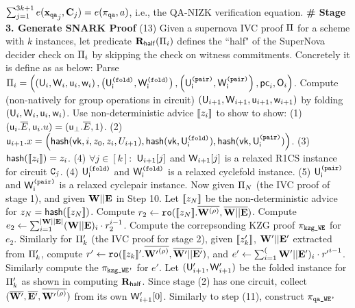 \begin{scriptsize}
\begin{algorithm*}[bt]
	$\sum_{j=1}^{3k+1} e({{{\mathbf {x}}}_{\texttt{qa}}}_j, {{\mathbf {C}}}_j) = e(\pi_{\texttt{qa}}, a)$, i.e.,
	the QA-NIZK verification equation. \newline
{\bf \# Stage 3. Generate SNARK Proof} \newline
(13) Given a supernova IVC proof ${\Pi}$ for a scheme with $k$
instances, let predicate $\mathbf{R}_{\mathsf{half}}({\Pi}_i)$ defines the ``half" 
of the SuperNova decider check on ${\Pi}_i$ by skipping
the check on witness commitments. 
Concretely it is define as as below:
Parse ${\Pi}_i = \left(
		\left(\mathsf{U}_i, \mathsf{W}_i, \mathsf{u}_i, \mathsf{w}_i\right), 
		\left(\mathsf{U^{\texttt{(fold)}}_{i}}, \mathsf{W^{\texttt{(fold)}}_{i}}\right), 
		\left(\mathsf{U^{\texttt{(pair)}}_{i}}, \mathsf{W^{\texttt{(pair)}}_{i}}\right),
		\mathsf{pc}_i, \mathsf{O}_i
	\right)$. 
Compute (non-natively for group operations in circuit)
$(\mathsf{U}_{i+1}, \mathsf{W}_{i+1}, \mathsf{u}_{i+1}, \mathsf{w}_{i+1})$ by folding
$(\mathsf{U}_i, \mathsf{W}_i, \mathsf{u}_i, \mathsf{w}_i)$. 
Use non-deterministic advice $[\![z_i]\!]$ to show
to show:  (1) $(\mathsf{u}_i.\overline{E}, \mathsf{u}_i.u) = (\mathsf{u}_\bot.\overline{E}, 1)$.
(2) $\mathsf{u}_{i+1}.x = \left(\mathsf{hash}(\mathsf{vk}, i, z_0, z_i, U_{i+1}), 
\mathsf{hash}(\mathsf{vk}, \mathsf{U^{\texttt{(fold)}}_{i}}), \mathsf{hash}(\mathsf{vk}, \mathsf{U^{\texttt{(pair)}}_{i}}) \right)$.
(3) $\mathsf{hash}([\![z_i]\!]) = z_i$.
(4) $\forall j\in [k]:$ $\mathsf{U}_{i+1}[j]$ and $\mathsf{W}_{i+1}[j]$ is
	a relaxed R1CS instance for circuit ${\texttt{C}}_{j}$.
(4) $\mathsf{U^{\texttt{(fold)}}_{i}}$ and $\mathsf{W^{\texttt{(fold)}}_{i}}$ is a relaxed cyclefold instance.
(5) $\mathsf{U^{\texttt{(pair)}}_{i}}$ and $\mathsf{W^{\texttt{(pair)}}_{i}}$ is a relaxed cyclepair instance. \newline
 \hspace*{0.1in} Now given ${\Pi}_N$ (the IVC proof of stage 1),
 	and given ${{\mathbf {W}}} || {{\mathbf {E}}}$ in Step 10.  Let
	$[\![z_N]\!]$ be the non-deterministic advice for $z_N = \mathsf{hash}([\![z_N]\!])$.
	Compute $r_2 \leftarrow 
		\texttt{ro}([\![z_N]\!].\overline{{{\mathbf {W}}}^{(\rho)}}, 
		\overline{{{\mathbf {W}}} || {{\mathbf {E}}}})$.
	Compute $e_2 \leftarrow \sum_{i=1}^{|{{\mathbf {W}}} || {{\mathbf {E}}}|}
		({{\mathbf {W}}} || {{\mathbf {E}}})_i \cdot r_2^{i-1}$. 
	Compute the correpsonding KZG proof $\pi_{\texttt{kzg\_WE}}$ for $e_2$.
	Similarly for ${\Pi}_k'$ (the IVC proof for stage 2),
	given $[\![z_k']\!]$, ${{\mathbf {W'}}} || {{\mathbf {E'}}}$ extracted
	from ${\Pi}_k'$,
	compute $r' \leftarrow \texttt{ro}([\![z_k]\!]'.\overline{{{\mathbf {W'}}}^{(\rho)}}
		, \overline{{{\mathbf {W'}}} || {{\mathbf {E'}}}})$, and
		$e' \leftarrow \sum_{i=1}^({{\mathbf {W'}}} || {{\mathbf {E'}}})_i \cdot
			{r'}^{i-1}$.
		Similarly compute the $\pi_{\texttt{kzg\_WE'}}$ for
		$e'$.
	Let $(\mathsf{U}_{i+1}', \mathsf{W}_{i+1}')$ be the folded instance for ${\Pi}_{k}'$
	as shown in computing $\mathbf{R}_{\mathsf{half}}$.
	Since stage (2) has one circuit, collect
		$(\overline{{{\mathbf {W'}}}}, \overline{{{\mathbf {E'}}}}, 
			\overline{{{\mathbf {W'}}}^{(\rho)}})$ from its own
			$\mathsf{W}_{i+1}'[0]$. 
	Similarly to step (11), construct $\pi_{\texttt{qa\_WE'}}$

\end{algorithm*}
\end{scriptsize}
